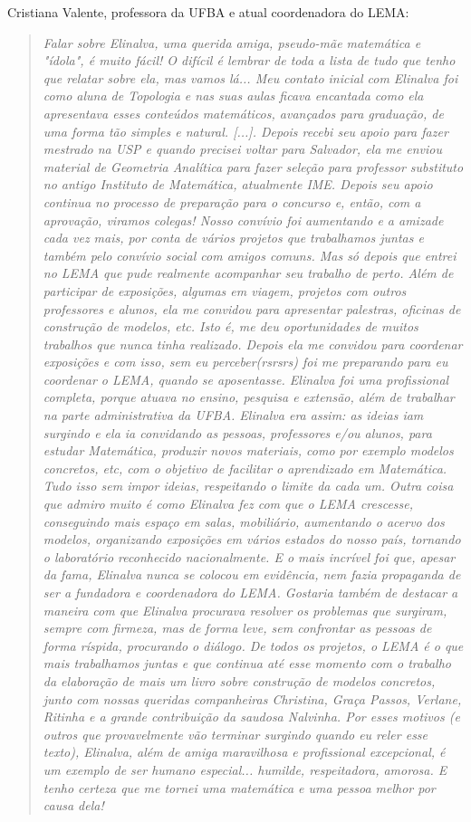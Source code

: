 \documentclass{hipatia}
\begin{document}
Cristiana Valente, professora da UFBA e atual coordenadora do LEMA:
\begin{quote} \textit{Falar sobre Elinalva, uma querida amiga, pseudo-mãe matemática e "ídola", é muito fácil! O difícil é lembrar de toda a lista de tudo que tenho que relatar sobre ela, mas vamos lá...
Meu contato inicial com Elinalva foi como aluna de Topologia e nas suas aulas ficava
encantada como ela apresentava esses conteúdos matemáticos, avançados para graduação,
de uma forma tão simples e natural. [...].
Depois recebi seu apoio para fazer mestrado na USP e quando precisei voltar para Salvador,
ela me enviou material de Geometria Analítica para fazer seleção para professor substituto no
antigo Instituto de Matemática, atualmente IME. Depois seu apoio continua no processo de
preparação para o concurso e, então, com a aprovação, viramos colegas! Nosso convívio foi aumentando e a amizade cada vez mais, por conta de vários projetos que trabalhamos juntas e também pelo convívio social com amigos comuns. Mas só depois que entrei no LEMA que pude realmente acompanhar seu trabalho de perto. Além de participar de exposições, algumas
em viagem, projetos com outros professores e alunos, ela me convidou para apresentar palestras, oficinas de construção de modelos, etc. Isto é, me deu oportunidades de muitos
trabalhos que nunca tinha realizado.
Depois ela me convidou para coordenar exposições e com isso, sem eu perceber(rsrsrs) foi
me preparando para eu coordenar o LEMA, quando se aposentasse.
Elinalva foi uma profissional completa, porque atuava no ensino, pesquisa e extensão, além de
trabalhar na parte administrativa da UFBA.
Elinalva era assim: as ideias iam surgindo e ela ia convidando as pessoas, professores e/ou
alunos, para estudar Matemática, produzir novos materiais, como por exemplo modelos concretos, etc, com o objetivo de facilitar o aprendizado em Matemática. Tudo isso sem impor
ideias, respeitando o limite da cada um.
Outra coisa que admiro muito é como Elinalva fez com que o LEMA crescesse, conseguindo mais espaço em salas, mobiliário, aumentando o acervo dos modelos, organizando exposições em
vários estados do nosso país, tornando o laboratório reconhecido nacionalmente.
E o mais incrível foi que, apesar da fama, Elinalva nunca se colocou em evidência, nem fazia
propaganda de ser a fundadora e coordenadora do LEMA.
Gostaria também de destacar a maneira com que Elinalva procurava resolver os problemas que surgiram, sempre com firmeza, mas de forma leve, sem confrontar as pessoas de forma
ríspida, procurando o diálogo.
De todos os projetos, o LEMA é o que mais trabalhamos juntas e que continua até esse momento com o trabalho da elaboração de mais um livro sobre construção de modelos concretos, junto com nossas queridas companheiras Christina, Graça Passos, Verlane,
Ritinha e a grande contribuição da saudosa Nalvinha.
Por esses motivos (e outros que provavelmente vão terminar surgindo quando eu reler esse
texto), Elinalva, além de amiga maravilhosa e profissional excepcional, é um exemplo de ser
humano especial... humilde, respeitadora, amorosa. E tenho certeza que me tornei uma
matemática e uma pessoa melhor por causa dela!} \end{quote}
\end{document}
